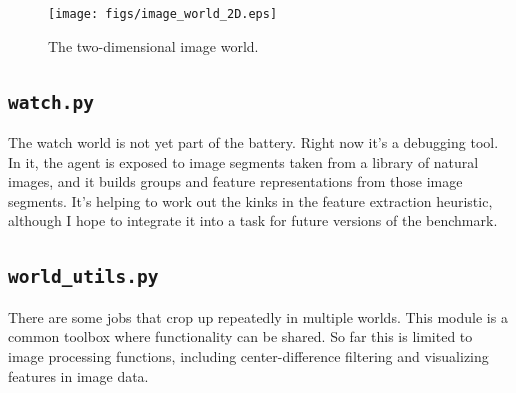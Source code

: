 \begin{figure}
\centering
\texttt{[image: figs/image\_world\_2D.eps]}
\caption{The two-dimensional image world.}
\label{image_2D}
\end{figure}


\subsection{\texttt{watch.py}}

The watch world is not yet part of the battery. Right now it's a debugging tool. In it, the agent is exposed to image segments taken from a library of natural images, and it builds groups and feature representations from those image segments. It's helping to work out the kinks in the feature extraction heuristic, although I hope to integrate it into a task for future versions of the benchmark.


\subsection{\texttt{world\_utils.py}}

There are some jobs that crop up repeatedly in multiple worlds. This module is a common toolbox where functionality can be shared. So far this is limited to image processing functions, including center-difference filtering and visualizing features in image data.

